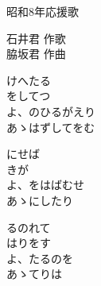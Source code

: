 \documentclass[10pt,b5j]{tarticle} %
\begin{document}
\begin{minipage}[c]{0.7\hsize} %
    \begin{center}
        {\LARGE
            昭和8年応援歌 %
        }
        {\small 
        }
    \end{center}
\end{minipage}
\begin{minipage}[c]{0.3\hsize} %
    \begin{flushright} %
        石井君 作歌\\脇坂君 作曲 %
    \end{flushright}
\end{minipage}

\vspace{1.5em} %
\newcommand{\linespace}{0.5em} %
\newcommand{\blocksize}{0.5\hsize} %
\begin{enumerate} %
    \begin{minipage}[c]{\blocksize}
    
        \vspace{\linespace}
        \item
        けへたる\\
        をしてつ\\
        よ、のひるがえり\\
        あゝはずしてをむ
        
        \vspace{\linespace}
        \item
        にせば\\
        きが\\
        よ、をはばむせ\\
        あゝにしたり
        
        \vspace{\linespace}
        \item
        るのれて\\
        はりをす\\
        よ、たるのを\\
        あゝてりは
    
    \end{minipage}
\end{enumerate} %
\end{document}
